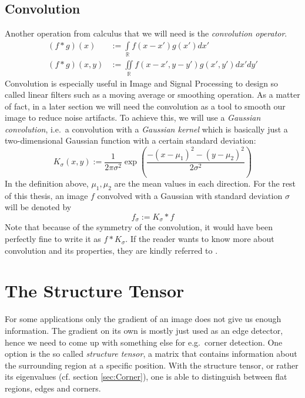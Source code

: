 \subsection{Convolution}
Another operation from calculus that we will need is the \textit{convolution operator}.\\
\begin{align}
    (f * g)(x) &:= \int\limits_\mathbb{R} f(x-x')g(x')dx'\label{eq:1DConv}\\
    (f * g)(x, y) &:= \iint\limits_\mathbb{R} f(x-x', y-y')g(x', y')dx'dy'\label{eq:2DConv}
\end{align}
Convolution is especially useful in Image and Signal Processing to design so called linear filters
such as a moving average or smoothing operation\cite{ipcv19-02}\cite{dspguide}. As a matter of fact, in a later
section we will need the convolution as a tool to smooth our image to reduce noise artifacts. To
achieve this, we will use a \textit{Gaussian convolution}, i.e.\ a convolution with a
\textit{Gaussian kernel} which is basically just a two-dimensional Gaussian function with a certain
standard deviation\cite{ipcv19-02}:
\begin{equation}
    K_\sigma (x, y) := \frac{1}{2\pi\sigma^2}\exp\left(\frac{-(x-\mu_1)^2 - (y -
            \mu_2)^2}{2\sigma^2}\right)
\end{equation}
In the definition above, $\mu_1, \mu_2$ are the mean values in each direction.
For the rest of this thesis, an image $f$ convolved with a Gaussian with standard deviation $\sigma$
will be denoted by \[f_\sigma := K_\sigma * f\]
Note that because of the symmetry of the
convolution, it would have been perfectly fine to write it as $f * K_\sigma$. If the reader wants
to know more about convolution and its properties, they are kindly referred to \cite{dspguide}.

\section{The Structure Tensor}\label{sec:Structure}
For some applications only the gradient of an image does not give us enough information. The
gradient on its own is mostly just used as an edge detector, hence we need to come up with
something else for e.g.\ corner detection\cite{ipcv19-13}. One option is the so called \textit{structure tensor}, a
matrix that contains information about the surrounding region at a specific position. With the
structure tensor, or rather its eigenvalues (cf. section \ref{sec:Corner}), one is able to
distinguish between flat regions, edges and corners.
